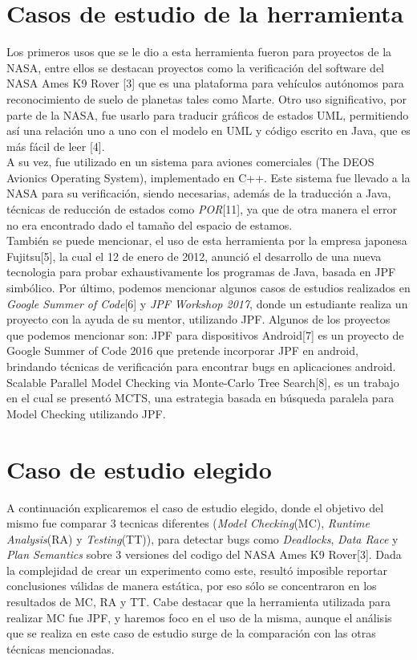 \documentclass[runningheads]{llncs}
\begin{document}
\section{Casos de estudio de la herramienta}

Los primeros usos que se le dio a esta herramienta fueron para proyectos de la NASA, entre ellos se destacan proyectos como la verificaci\'on del software del NASA Ames K9 Rover [3] que es una plataforma para veh\'iculos aut\'onomos para reconocimiento de suelo de planetas tales como Marte.
Otro uso significativo, por parte de la NASA, fue usarlo para traducir gr\'aficos de estados UML, permitiendo as\'i una relaci\'on uno a uno con el modelo en UML y c\'odigo escrito en Java, que es m\'as f\'acil de leer [4].\\
A su vez, fue utilizado en un sistema para aviones comerciales (The DEOS Avionics Operating System), implementado en C++. Este sistema fue llevado a la NASA para su verificaci\'on, siendo necesarias, adem\'as de la traducci\'on a Java, t\'ecnicas de reducci\'on de estados como \textit{POR}[11], ya que de otra manera el error no era encontrado dado el tama\~no del espacio de estamos.\\
Tambi\'en se puede mencionar, el uso de esta herramienta por la empresa japonesa Fujitsu[5], la cual el 12 de enero de 2012, anunci\'o el desarrollo de una nueva tecnologia para probar exhaustivamente los programas de Java, basada en JPF simb\'olico.
Por \'ultimo, podemos mencionar algunos casos de estudios realizados en \textit{Google Summer of Code}[6] y \textit{JPF Workshop 2017}, donde un estudiante realiza un proyecto con la ayuda de su mentor, utilizando JPF. Algunos de los proyectos que podemos mencionar son: 
JPF para dispositivos Android[7] es un proyecto de Google Summer of Code 2016 que pretende incorporar JPF en android, brindando t\'ecnicas de verificaci\'on para encontrar bugs en aplicaciones android.\\
Scalable Parallel Model Checking via Monte-Carlo Tree Search[8], es un trabajo en el cual se present\'o MCTS, una estrategia basada en b\'usqueda paralela para Model Checking utilizando JPF.\\

\section{Caso de estudio elegido}
A continuaci\'on explicaremos el caso de estudio elegido, donde el objetivo del mismo fue comparar 3 tecnicas diferentes (\textit{Model Checking}(MC), \textit{Runtime Analysis}(RA) y \textit{Testing}(TT)), para detectar bugs como \textit{Deadlocks}, \textit{Data Race} y \textit{Plan Semantics} sobre 3 versiones del codigo del NASA Ames K9 Rover[3].
Dada la complejidad de crear un experimento como este, result\'o imposible reportar conclusiones v\'alidas de manera est\'atica, por eso s\'olo se concentraron en los resultados de MC, RA y TT. Cabe destacar que la herramienta utilizada para realizar MC fue JPF, y haremos foco en el uso de la misma, aunque el an\'alisis que se realiza en este caso de estudio surge de la comparaci\'on con las otras t\'ecnicas mencionadas.
\end{document}
